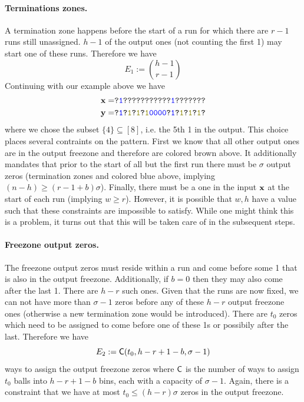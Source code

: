 \paragraph{Terminations zones.} A termination zone happens before the start of a run for which there are $r-1$ runs still unassigned. $h-1$ of the output ones (not counting the first 1) may start one of these runs. Therefore we have 
$$
E_1:=\binom{h-1}{r-1}
$$
Continuing with our example above we have
\begin{align*}
    \xv=&\texttt{?\blue{1}???????????\blue{1}???????}\\
    \yv=&\texttt{?\blue{1}?\olive{1}?\olive{1}?\olive{1}\blue{0000}?\blue{1}?\olive{1}?\olive{1}?\olive{1}?}
\end{align*}
where we chose the subset $\{4\}\subseteq[8]$, i.e. the 5th 1 in the output. This choice places several contraints on the pattern. First we know that all other output ones are in the output freezone and therefore are colored brown above. It additionally mandates that prior to the start of all but the first run there must be $\sigma$ output zeros (termination zones and colored blue above, implying $(n-h)\geq (r-1+b)\sigma$). Finally, there must be a one in the input $\mathbf{x}$ at the start of each run (implying $w\geq r$). However, it is possible that $w,h$ have a value such that these constraints are impossible to satisfy. While one might think this is a problem, it turns out that this will be taken care of in the subsequent steps.

\paragraph{Freezone output zeros.} The freezone output zeros must reside within a run and come before some 1 that is also in the output freezone. Additionally, if $b=0$ then they may also come after the last 1. There are $h-r$ such ones. Given that the runs are now fixed, we can not have more than $\sigma-1$ zeros before any of these $h-r$ output freezone ones (otherwise a new termination zone would be introduced). There are $t_0$ zeros which need to be assigned to come before one of these 1s or possibily after the last. Therefore we have
$$
    E_2:=\mathsf{C}(t_0, h-r + 1-b, \sigma-1)
$$
ways to assign the output freezone zeros where $\mathsf{C}$ is the number of ways to assign $t_0$ balls into $h-r+ 1-b$ bins, each with a capacity of $\sigma-1$.
Again, there is a constraint that we have at most $t_0\leq (h-r)\sigma$ zeros in the output freezone.

